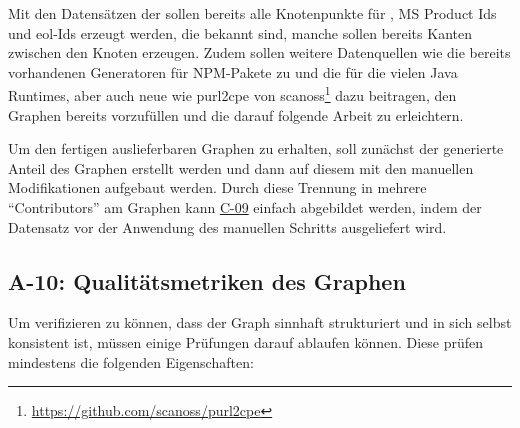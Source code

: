 Mit den Datensätzen der \metaeffektsp sollen bereits alle Knotenpunkte für , MS Product Ids und \acrshort{eol}-Ids erzeugt werden, die bekannt sind, manche sollen bereits Kanten zwischen den Knoten erzeugen.
Zudem sollen weitere Datenquellen wie die bereits vorhandenen Generatoren für NPM-Pakete zu  und die für die vielen Java Runtimes, aber auch neue wie purl2cpe von scanoss\footnote{\url{https://github.com/scanoss/purl2cpe}} dazu beitragen, den Graphen bereits vorzufüllen und die darauf folgende Arbeit zu erleichtern.

Um den fertigen auslieferbaren Graphen zu erhalten, soll zunächst der generierte Anteil des Graphen erstellt werden und dann auf diesem mit den manuellen Modifikationen aufgebaut werden.
Durch diese Trennung in mehrere \enquote{Contributors} am Graphen kann \hyperref[subsec:c-09-sharing-of-public-data]{C-09} einfach abgebildet werden, indem der Datensatz vor der Anwendung des manuellen Schritts ausgeliefert wird.

\subsection{A-10: Qualitätsmetriken des Graphen}\label{subsec:req-graph-inner-consistency}


Um verifizieren zu können, dass der Graph sinnhaft strukturiert und in sich selbst konsistent ist, müssen einige Prüfungen darauf ablaufen können.
Diese prüfen mindestens die folgenden Eigenschaften:

